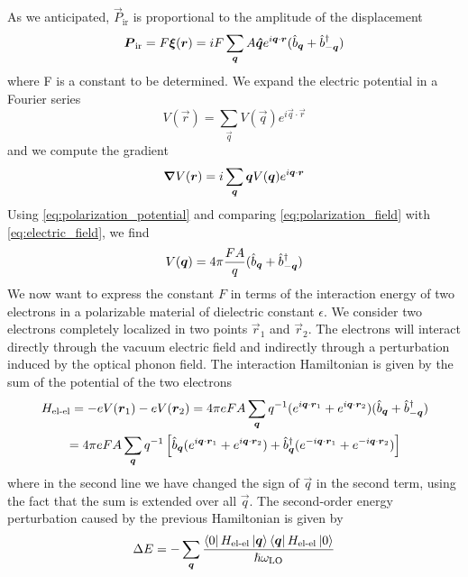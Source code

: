 As we anticipated, $\vec{P}_\text{ir}$ is proportional to the amplitude of the displacement
\begin{equation} \label{eq:polarization_field}
    \mathbf{\boldsymbol{P}}_\text{ir} = F \mathbf{\boldsymbol{\xi}}(\mathbf{\boldsymbol{r}}) = i F \sum_{\mathbf{\boldsymbol{q}}} A \mathbf{\boldsymbol{\hat{q}}} e^{i\mathbf{\boldsymbol{q}} \cdot \mathbf{\boldsymbol{r}}} (\hat{b}_{\mathbf{\boldsymbol{q}}} + \hat{b}^\dagger_{-\mathbf{\boldsymbol{q}}})
\end{equation}
where F is a constant to be determined. We expand the electric potential in a Fourier series
\begin{equation}
    V(\vec{r}) = \sum_\vec{q} V(\vec{q}) e^{i\vec{q} \cdot \vec{r}}
\end{equation}
and we compute the gradient
\begin{equation} \label{eq:electric_field}
    \grad V(\mathbf{\boldsymbol{r}}) = i \sum_{\mathbf{\boldsymbol{q}}} \mathbf{\boldsymbol{q}} V(\mathbf{\boldsymbol{q}}) e^{i\mathbf{\boldsymbol{q}} \cdot \mathbf{\boldsymbol{r}}}
\end{equation}
Using \cref{eq:polarization_potential} and comparing \cref{eq:polarization_field} with \cref{eq:electric_field}, we find
\begin{equation}
    V(\mathbf{\boldsymbol{q}}) = 4\pi \frac{F A}{q} (\hat{b}_{\mathbf{\boldsymbol{q}}} + \hat{b}^\dagger_{-\mathbf{\boldsymbol{q}}})
\end{equation}
We now want to express the constant $F$ in terms of the interaction energy of two electrons in a polarizable material of dielectric constant $\epsilon$. We consider two electrons completely localized in two points $\vec{r}_1$ and $\vec{r}_2$. The electrons will interact directly through the vacuum electric field and indirectly through a perturbation induced by the optical phonon field. The interaction Hamiltonian is given by the sum of the potential of the two electrons
\begin{multline} \label{eq:hamiltonian_coulomb_medium}
    H_\text{el-el} = -e V(\mathbf{\boldsymbol{r}}_1) -e V(\mathbf{\boldsymbol{r}}_2)
    = 4\pi e F A \sum_{\mathbf{\boldsymbol{q}}} q^{-1} (e^{i\mathbf{\boldsymbol{q}} \cdot \mathbf{\boldsymbol{r}}_1} + e^{i\mathbf{\boldsymbol{q}} \cdot \mathbf{\boldsymbol{r}}_2} ) (\hat{b}_{\mathbf{\boldsymbol{q}}} + \hat{b}^\dagger_{-\mathbf{\boldsymbol{q}}})
    \\ = 4\pi e F A \sum_{\mathbf{\boldsymbol{q}}} q^{-1} \left[ \hat{b}_{\mathbf{\boldsymbol{q}}} (e^{i\mathbf{\boldsymbol{q}} \cdot \mathbf{\boldsymbol{r}}_1} + e^{i\mathbf{\boldsymbol{q}} \cdot \mathbf{\boldsymbol{r}}_2} )   + \hat{b}^\dagger_{\mathbf{\boldsymbol{q}}} (e^{-i\mathbf{\boldsymbol{q}} \cdot \mathbf{\boldsymbol{r}}_1} + e^{-i\mathbf{\boldsymbol{q}} \cdot \mathbf{\boldsymbol{r}}_2} )\right]
\end{multline}
where in the second line we have changed the sign of $\vec{q}$ in the second term, using the fact that the sum is extended over all $\vec{q}$. The second-order energy perturbation caused by the previous Hamiltonian is given by
\begin{equation}
    \Delta E = -\sum_{\mathbf{\boldsymbol{q}}} \frac{\bra{0}H_\text{el-el}\ket{\mathbf{\boldsymbol{q}}}\bra{\mathbf{\boldsymbol{q}}}H_\text{el-el}\ket{0}}{\hslash\omega_\text{LO}}
\end{equation}
